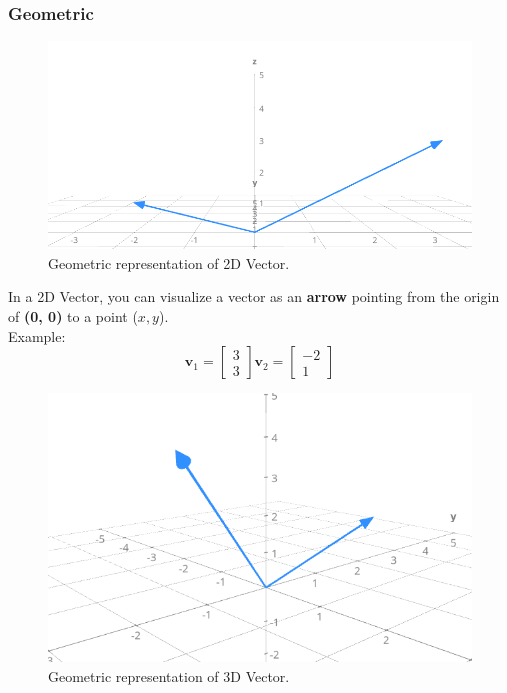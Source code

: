 \documentclass[12pt]{article}
\begin{document}
        \subsubsection{Geometric}
            \begin{figure}[h]
                \centering
                \includegraphics[width=1\textwidth]{1-1.png} 
                \caption{Geometric representation of 2D Vector.}
                \label{fig:1}
            \end{figure}
        
            In a 2D Vector, you can visualize a vector as an \textbf{arrow} pointing from the origin of \textbf{(0, 0)} to a point ($x, y$). \\
            Example:
            \begin{equation}
                \mathbf{v}_1 = \begin{bmatrix} 3 \\ 3 \end{bmatrix}
                \mathbf{v}_2 = \begin{bmatrix} -2 \\ 1 \end{bmatrix}
            \end{equation}
            
            \begin{figure}[H]
                \centering
                \includegraphics[width=1\textwidth]{1-2.png} 
                \caption{Geometric representation of 3D Vector.}
                \label{fig:2}
            \end{figure}
            
\end{document}

